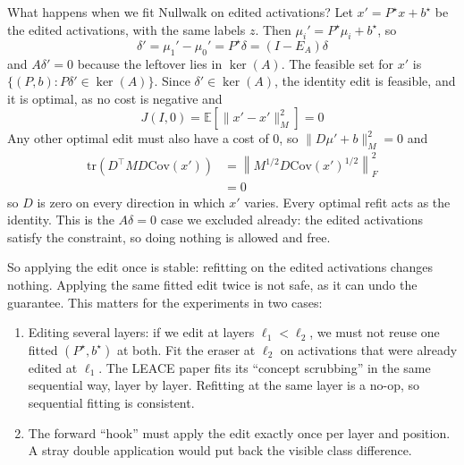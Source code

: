 \documentclass[10pt,a4paper,twocolumn]{article}
\begin{document}
	What happens when we fit Nullwalk on edited activations? Let $x' = P^\star x + b^\star$ be the edited activations, with the same labels $z$. Then $\mu_i' = P^\star \mu_i + b^\star$, so
	$$\delta' = \mu_1' - \mu_0' = P^\star \delta = (I - E_A) \delta$$
	and $A \delta' = 0$ because the leftover lies in $\ker(A)$. The feasible set for $x'$ is $\{ (P, b) : P \delta' \in \ker(A) \}$. Since $\delta' \in \ker(A)$, the identity edit is feasible, and it is optimal, as no cost is negative and
	$$J(I, 0) = \mathbb{E} \left[ \| x' - x' \|_M^2 \right] = 0$$
	Any other optimal edit must also have a cost of $0$, so $\| D \mu' + b \|_M^2 = 0$ and
	$$\begin{aligned}
		\mathrm{tr} \left( D^\top M D \mathrm{Cov}(x') \right) & = \left\| M^{1/2} D \mathrm{Cov}(x')^{1/2} \right\|_F^2 \\
		& = 0
	\end{aligned}$$
	so $D$ is zero on every direction in which $x'$ varies. Every optimal refit acts as the identity. This is the $A \delta = 0$ case we excluded already: the edited activations satisfy the constraint, so doing nothing is allowed and free.

	So applying the edit once is stable: refitting on the edited activations changes nothing. Applying the same fitted edit twice is not safe, as it can undo the guarantee. This matters for the experiments in two cases:
	\begin{enumerate}
		\item Editing several layers: if we edit at layers $\ell_1 < \ell_2$, we must not reuse one fitted $(P^\star, b^\star)$ at both. Fit the eraser at $\ell_2$ on activations that were already edited at $\ell_1$. The LEACE paper fits its ``concept scrubbing'' in the same sequential way, layer by layer. Refitting at the same layer is a no-op, so sequential fitting is consistent.
		\item The forward ``hook'' must apply the edit exactly once per layer and position. A stray double application would put back the visible class difference.
	\end{enumerate}
\end{document}
